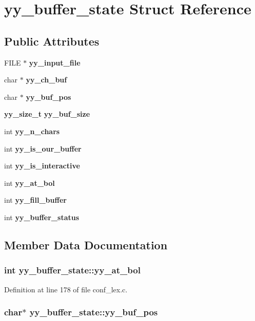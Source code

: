 \section{yy\_\-buffer\_\-state Struct Reference}
\label{structyy__buffer__state}
\subsection*{Public Attributes}
\begin{CompactItemize}
\item 
FILE $\ast$ {\bf yy\_\-input\_\-file}
\item 
char $\ast$ {\bf yy\_\-ch\_\-buf}
\item 
char $\ast$ {\bf yy\_\-buf\_\-pos}
\item 
{\bf yy\_\-size\_\-t} {\bf yy\_\-buf\_\-size}
\item 
int {\bf yy\_\-n\_\-chars}
\item 
int {\bf yy\_\-is\_\-our\_\-buffer}
\item 
int {\bf yy\_\-is\_\-interactive}
\item 
int {\bf yy\_\-at\_\-bol}
\item 
int {\bf yy\_\-fill\_\-buffer}
\item 
int {\bf yy\_\-buffer\_\-status}
\end{CompactItemize}


\subsection{Member Data Documentation}
\subsubsection{\setlength{\rightskip}{0pt plus 5cm}int {\bf yy\_\-buffer\_\-state::yy\_\-at\_\-bol}}\label{structyy__buffer__state_o7}




Definition at line 178 of file conf\_\-lex.c.
\subsubsection{\setlength{\rightskip}{0pt plus 5cm}char$\ast$ {\bf yy\_\-buffer\_\-state::yy\_\-buf\_\-pos}}\label{structyy__buffer__state_o2}




